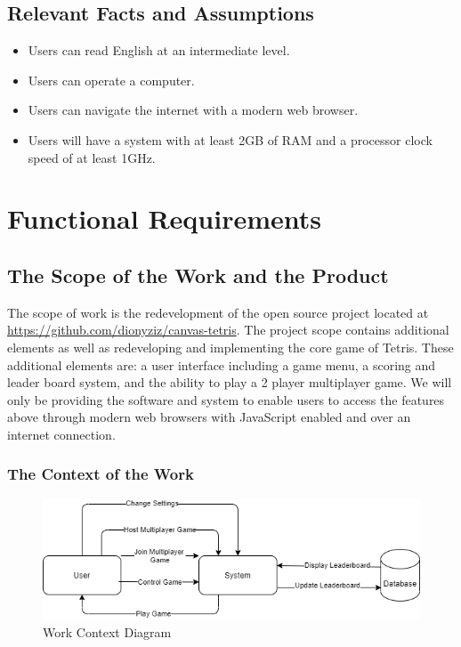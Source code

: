 \documentclass[12pt, titlepage]{article}
\begin{document}
\subsection{Relevant Facts and Assumptions}
\begin{itemize}
    \item Users can read English at an intermediate level.
    \item Users can operate a computer.
    \item Users can navigate the internet with a modern web browser.
    \item Users will have a system with at least 2GB of RAM and a processor clock speed of at least 1GHz.
\end{itemize}

\section{Functional Requirements}
\subsection{The Scope of the Work and the Product}
The scope of work is the redevelopment of the open source project located at \url{https://github.com/dionyziz/canvas-tetris}. The project scope contains additional elements as well as redeveloping and implementing the core game of Tetris. These additional elements are: a user interface including a game menu, a scoring and leader board system, and the ability to play a 2 player multiplayer game. We will only be providing the software and system to enable users to access the features above through modern web browsers with JavaScript enabled and over an internet connection.

\subsubsection{The Context of the Work}
\begin{figure}[H]
    \centering
    \includegraphics[width=5in]{WorkContext.png} 
    \caption{Work Context Diagram}
    \label{fig:work_context}
\end{figure}
\end{document}
